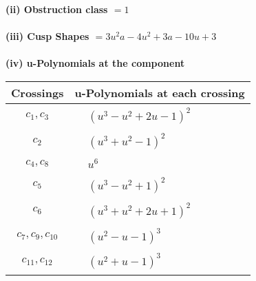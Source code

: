 \documentclass[1p]{elsarticle_modified}
\theoremstyle{definition}
\begin{document}
\flushleft \textbf{(ii) Obstruction class $= 1$}\\~\\
\flushleft \textbf{(iii) Cusp Shapes $= 3 u^2 a-4 u^2+3 a-10 u+3$}\\~\\
\newpage\renewcommand{\arraystretch}{1}
\flushleft \textbf{(iv) u-Polynomials at the component}\newline \\
\begin{tabular}{m{50pt}|m{274pt}}
Crossings & \hspace{64pt}u-Polynomials at each crossing \\
\hline $$\begin{aligned}c_{1},c_{3}\end{aligned}$$&$\begin{aligned}
&(u^3- u^2+2 u-1)^2
\end{aligned}$\\
\hline $$\begin{aligned}c_{2}\end{aligned}$$&$\begin{aligned}
&(u^3+u^2-1)^2
\end{aligned}$\\
\hline $$\begin{aligned}c_{4},c_{8}\end{aligned}$$&$\begin{aligned}
&u^6
\end{aligned}$\\
\hline $$\begin{aligned}c_{5}\end{aligned}$$&$\begin{aligned}
&(u^3- u^2+1)^2
\end{aligned}$\\
\hline $$\begin{aligned}c_{6}\end{aligned}$$&$\begin{aligned}
&(u^3+u^2+2 u+1)^2
\end{aligned}$\\
\hline $$\begin{aligned}c_{7},c_{9},c_{10}\end{aligned}$$&$\begin{aligned}
&(u^2- u-1)^3
\end{aligned}$\\
\hline $$\begin{aligned}c_{11},c_{12}\end{aligned}$$&$\begin{aligned}
&(u^2+u-1)^3
\end{aligned}$\\
\hline
\end{tabular}\\~\\
\end{document}

